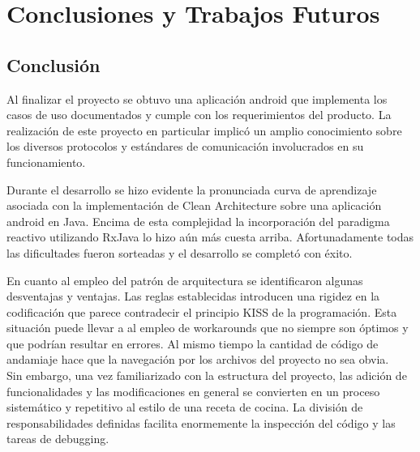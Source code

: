 
\chapter{Conclusiones y Trabajos Futuros} %

\label{Chapter13} %


\section{Conclusión}
Al finalizar el proyecto se obtuvo una aplicación android que implementa los casos de uso documentados y cumple con los requerimientos del producto. 
La realización de este proyecto en particular implicó un amplio conocimiento sobre los diversos protocolos y estándares de comunicación involucrados en su funcionamiento.
 
Durante el desarrollo se hizo evidente la pronunciada curva de aprendizaje asociada con la implementación de Clean Architecture sobre una aplicación android en Java. Encima de esta complejidad la incorporación del paradigma reactivo utilizando RxJava lo hizo aún más cuesta arriba.
Afortunadamente todas las dificultades fueron sorteadas y el desarrollo se completó con éxito.

En cuanto al empleo del patrón de arquitectura se identificaron algunas desventajas y ventajas.
Las reglas establecidas introducen una rigidez en la codificación que parece contradecir el principio KISS de la programación. Esta situación puede llevar a al empleo de workarounds que no siempre son óptimos y que podrían resultar en errores. Al mismo tiempo la cantidad de código de andamiaje hace que la navegación por los archivos del proyecto no sea obvia.\\
Sin embargo, una vez familiarizado con la estructura del proyecto, las adición de funcionalidades y las modificaciones en general se convierten en un proceso sistemático y repetitivo al estilo de una receta de cocina. La división de responsabilidades definidas facilita enormemente la inspección del código y las tareas de debugging.

